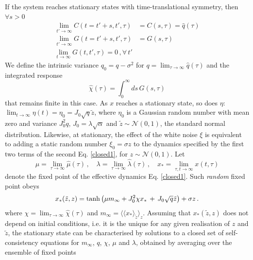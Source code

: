 \documentclass[%
 reprint,
superscriptaddress,
 amsmath,amssymb,
 prl,
]{revtex4-2}
\begin{document}
If the system reaches  stationary states with time-translational symmetry, then  $\forall{s}>0$
\begin{align} \nonumber
 \lim_{t'\rightarrow \infty}C(t=t'+s,t', \tau) &= C(s, \tau) = \hat{q}(\tau) \\\nonumber \lim_{t'\rightarrow \infty}G(t=t'+s,t', \tau) &=  G(s, \tau)  \\ \lim_{t\rightarrow \infty}G(t,t', \tau) =0\,,\forall\, t'
\end{align}
 We define the  intrinsic variance  $q_0= q - \sigma^2$ for \linebreak $q =\lim_{\tau\rightarrow \infty} \hat{q}(\tau)$ and the integrated response
 $$\hat{\chi}(\tau) = \int_0^{\infty}  ds \,G(s, \tau)$$ 
that remains finite in this case. 
As $x$ reaches a stationary state, so does $\eta$: $\lim_{t\rightarrow \infty} \eta(t) = \eta_0= J_0\sqrt{q}\tilde{z}$, where  $\eta_0$ is a Gaussian  random number with  mean zero and variance $ J_0^2 q$, $J_0 = \lambda \sqrt{\alpha}$ and  $\tilde{z} \sim\mathcal{N}(0,1)$, the standard normal distribution. Likewise, at stationary, the effect of the white noise $\xi$ is equivalent to adding a static  random number $\xi_0 = \sigma z$ to the dynamics specified by the first two terms of the second Eq. \eqref{closed1}, for $z \sim\mathcal{N}(0,1)$. Let 
$$\mu = \lim_{\tau\rightarrow \infty} \hat{\mu}(\tau)\,,\quad \lambda = \lim_{\tau\rightarrow \infty} \hat{\lambda}(\tau)\,,\quad  x_* = \lim_{\tau, t \rightarrow \infty} x(t, \tau)$$ 
denote the fixed point of the effective dynamics  Eq. \eqref{closed1}. Such \emph{random} fixed point obeys 
\begin{equation}
    x_*(\tilde{z},z) = {\rm tanh}\left(\mu m_\infty  + J_0^2\chi  x_*  \,+\,J_0\sqrt{q}\tilde{z} \right) + \sigma z\,.
\label{fixed_point_of_closed1}
\end{equation}
where $\chi= \lim_{\tau\rightarrow \infty} \hat{\chi}(\tau)$ and $m_\infty = \langle \langle x_*\rangle_{\tilde{z}} \rangle_z$.
  Assuming that $ x_*(\tilde{z},z)$ does not depend on initial conditions, i.e. it is the unique  for any given realisation of $z$ and $\tilde{z}$,   the  stationary state can be characterised by  solutions to  a closed set of self-consistency equations for $m_\infty$, $q$,  $ \chi$, $\mu$ and $\lambda$, obtained by averaging over the ensemble of fixed points %
\end{document}
